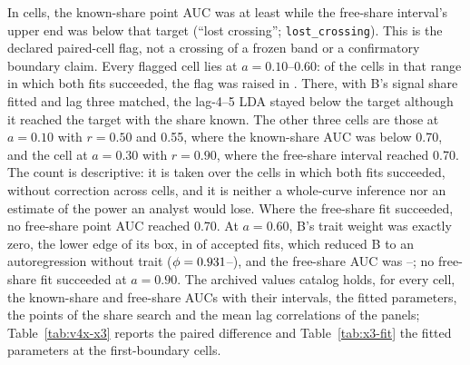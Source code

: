 In  cells, the known-share point AUC was at least  while the free-share interval's upper end was below that target (``lost crossing''; \texttt{lost\_crossing}). This is the declared paired-cell flag, not a crossing of a frozen band or a confirmatory boundary claim. Every flagged cell lies at $a=0.10$--0.60: of the  cells in that range in which both fits succeeded, the flag was raised in . There, with B's signal share fitted and lag three matched, the lag-4--5 LDA stayed below the target although it reached the target with the share known. The other three cells are those at $a=0.10$ with $r=0.50$ and 0.55, where the known-share AUC was below 0.70, and the cell at $a=0.30$ with $r=0.90$, where the free-share interval reached 0.70. The count is descriptive: it is taken over the cells in which both fits succeeded, without correction across cells, and it is neither a whole-curve inference nor an estimate of the power an analyst would lose. Where the free-share fit succeeded, no free-share point AUC reached 0.70. At $a=0.60$, B's trait weight was exactly zero, the lower edge of its box, in  of  accepted fits, which reduced B to an autoregression without trait ($\phi=\resultnum{j.x3.free.a6000.phi.min}{0.931}$--), and the free-share AUC was --; no free-share fit succeeded at $a=0.90$.
The archived values catalog holds, for every cell, the known-share and free-share AUCs with their intervals, the fitted parameters, the points of the share search and the mean lag correlations of the panels; Table~\ref{tab:v4x-x3} reports the paired difference and Table~\ref{tab:x3-fit} the fitted parameters at the first-boundary cells.

